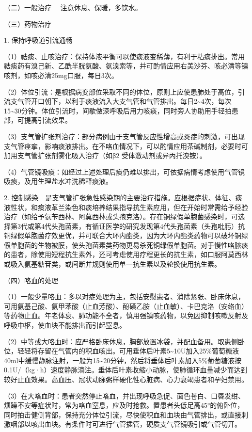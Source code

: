 {（二）一般治疗} 　注意休息、保暖，多饮水。

{（三）药物治疗}

1. 保持呼吸道引流通畅

（1）祛痰、止咳治疗：保持体液平衡可以使痰液变稀薄，有利于粘痰排出。常用祛痰药有溴己新、乙酰半胱氨酸、氨溴索等，并可酌情应用右美沙芬、咳必清等镇咳剂，如咳必清25mg口服，每日3次。

（2）体位引流：是根据病变部位采取不同的体位，原则上应使患肺处于高位，引流支气管开口朝下，以利于痰液流入大支气管和气管排出。每日2\textasciitilde{}4次，每次15\textasciitilde{}30分钟。体位引流时，间歇做深呼吸后用力咳痰，同时旁人协助用手轻拍患部，可提高引流效果。

（3）支气管扩张剂治疗：部分病例由于支气管反应性增高或炎症的刺激，可出现支气管痉挛，影响痰液排出。在不咯血情况下，可以酌情应用茶碱制剂，必要时可加用支气管扩张剂雾化吸入治疗（如β{2}
受体激动剂或异丙托溴铵）。

（4）气管镜吸痰：如经过上述处理后痰仍难以排出，可依据病情考虑使用气管镜吸痰，及用生理盐水冲洗稀释痰液。

2.
控制感染　是支气管扩张急性感染期的主要治疗措施。应根据症状、体征、痰液性状，和痰液革兰染色和痰培养结果指导抗生素应用，但在开始时常需给予经验治疗（如给予氨苄西林、阿莫西林或头孢克洛）。存在铜绿假单胞菌感染时，可选择第3代或第4代头孢菌素，有循证医学的研究发现第4代头孢菌素（头孢吡肟）抗铜绿假单胞菌疗效更优，并可联合大环内酯类，因为大环内酯类药物可以破坏铜绿假单胞菌的生物被膜，使头孢菌素类药物更易杀死铜绿假单胞菌。对于慢性咯脓痰的患者，除使用短程抗生素外，还可考虑使用疗程更长的抗生素，如口服阿莫西林或吸入氨基糖苷类，或间断并规则使用单一抗生素以及轮换使用抗生素。

{（四）咯血的处理}

（1）一般少量咯血：多以对症处理为主，包括安慰患者、消除紧张、卧床休息，可用氨基己酸、氨甲苯酸（止血芳酸）、酚磺乙胺（止血敏）、卡巴克洛（安络血）等药物止血。年老体衰、肺功能不全者，慎用强镇咳药物，以免因抑制咳嗽反射及呼吸中枢，使血块不能排出而引起窒息。

（2）中等或大咯血时：应严格卧床休息，胸部放置冰袋，并配血备用。取患侧卧位，轻轻将存留在气管内的积血咳出。可用垂体后叶素5\textasciitilde{}10U加入25\%葡萄糖液40ml中缓慢静脉注射，一般为15\textasciitilde{}20分钟，然后将垂体后叶素加入5\%葡萄糖液按0.1U/（kg·h）速度静脉滴注。垂体后叶素收缩小动脉，使肺循环血量减少而达到较好止血效果。高血压、冠状动脉粥样硬化性心脏病、心力衰竭患者和孕妇禁用。

（3）在大咯血时：患者突然停止咯血，并出现呼吸急促、面色苍白、口唇发绀、烦躁不安等症状时，常为咯血窒息，应及时抢救。置患者头低足高45°的俯卧位，同时拍击健侧背部，保持充分体位引流，尽快使积血和血块由气管排出，或直接刺激咽部以咳出血块。有条件时可进行气管插管，硬质支气管镜吸引或气管切开。

